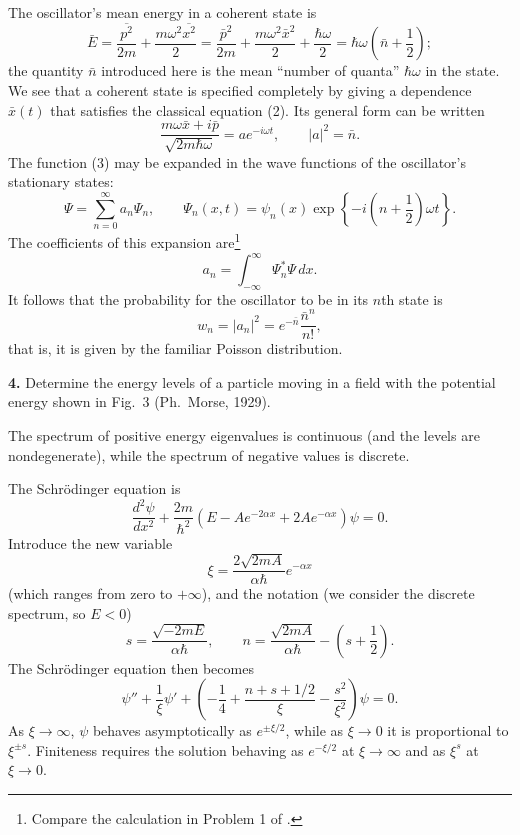 The oscillator's mean energy in a coherent state is
\begin{equation}
  \bar E=\frac{\overline{p^2}}{2m}+\frac{m\omega^2\overline{x^2}}{2}
  =\frac{\bar p^2}{2m}+\frac{m\omega^2\bar x^2}{2}+\frac{\hbar\omega}{2}
  =\hbar\omega\left(\bar n+\frac12\right);
  \tag{4}
\end{equation}
the quantity $\bar n$ introduced here is the mean ``number of quanta''
$\hbar\omega$ in the state. We see that a coherent state is specified
completely by giving a dependence $\bar x(t)$ that satisfies the classical
equation (2). Its general form can be written
\begin{equation}
  \frac{m\omega\bar x+i\bar p}{\sqrt{2m\hbar\omega}}
  =ae^{-i\omega t},\qquad |a|^2=\bar n.
  \tag{5}
\end{equation}
The function (3) may be expanded in the wave functions of the oscillator's
stationary states:
\[
  \Psi=\sum_{n=0}^{\infty}a_n\Psi_n,
  \qquad
  \Psi_n(x,t)=\psi_n(x)\exp\left\{-i\left(n+\frac12\right)\omega t\right\}.
\]
The coefficients of this expansion are\footnote{Compare the calculation in
Problem 1 of .}
\begin{equation}
  a_n=\int_{-\infty}^{\infty}\Psi_n^*\Psi\,dx.
  \tag{6}
\end{equation}
It follows that the probability for the oscillator to be in its $n$th state
is
\begin{equation}
  w_n=|a_n|^2=e^{-\bar n}\frac{\bar n^n}{n!},
  \tag{7}
\end{equation}
that is, it is given by the familiar Poisson distribution.

\ProblemHeading
\noindent\textbf{4.} Determine the energy levels of a particle moving in a
field with the potential energy shown in Fig.~3 (Ph.~Morse, 1929).

\SolutionHeading
The spectrum of positive energy eigenvalues is continuous (and the levels are
nondegenerate), while the spectrum of negative values is discrete.

The Schrödinger equation is
\[
  \frac{d^2\psi}{dx^2}+\frac{2m}{\hbar^2}
  (E-Ae^{-2\alpha x}+2Ae^{-\alpha x})\psi=0.
\]
Introduce the new variable
\[
  \xi=\frac{2\sqrt{2mA}}{\alpha\hbar}e^{-\alpha x}
\]
(which ranges from zero to $+\infty$), and the notation (we consider the
discrete spectrum, so $E<0$)
\begin{equation}
  s=\frac{\sqrt{-2mE}}{\alpha\hbar},\qquad
  n=\frac{\sqrt{2mA}}{\alpha\hbar}-\left(s+\frac12\right).
  \tag{1}
\end{equation}
The Schrödinger equation then becomes
\[
  \psi''+\frac1\xi\psi'
  +\left(-\frac14+\frac{n+s+1/2}{\xi}-\frac{s^2}{\xi^2}\right)\psi=0.
\]
As $\xi\to\infty$, $\psi$ behaves asymptotically as $e^{\pm\xi/2}$, while as
$\xi\to0$ it is proportional to $\xi^{\pm s}$. Finiteness requires the
solution behaving as $e^{-\xi/2}$ at $\xi\to\infty$ and as $\xi^s$ at
$\xi\to0$.

